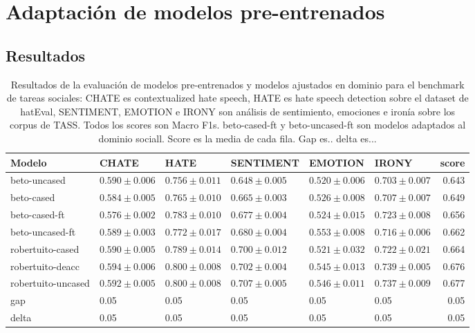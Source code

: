 \section{Adaptación de modelos pre-entrenados}


\subsection{Resultados}

\begin{table}[ht]
    \centering
    \footnotesize
    \begin{tabular}{llllllr}
        \toprule
        Modelo             & CHATE                   &  HATE              &  SENTIMENT        &  EMOTION          &  IRONY            &     score \\
        \midrule
        beto-uncased       & $0.590 \pm 0.006$ & $0.756 \pm 0.011$ &  $0.648 \pm 0.005$ &  $0.520 \pm 0.006$ & $0.703 \pm 0.007$ &  0.643 \\
        beto-cased         & $0.584 \pm 0.005$ & $0.765 \pm 0.010$ &  $0.665 \pm 0.003$ &  $0.526 \pm 0.008$ & $0.707 \pm 0.007$ &  0.649 \\
        beto-cased-ft      & $0.576 \pm 0.002$ & $0.783 \pm 0.010$ &  $0.677 \pm 0.004$ &  $0.524 \pm 0.015$ & $0.723 \pm 0.008$ &  0.656 \\
        beto-uncased-ft    & $0.589 \pm 0.003$ & $0.772 \pm 0.017$ &  $0.680 \pm 0.004$ &  $0.553 \pm 0.008$ & $0.716 \pm 0.006$ &  0.662 \\
        robertuito-cased   & $0.590 \pm 0.005$ & $0.789 \pm 0.014$ &  $0.700 \pm 0.012$ &  $0.521 \pm 0.032$ & $0.722 \pm 0.021$ &  0.664 \\
        robertuito-deacc   & $0.594 \pm 0.006$ & $0.800 \pm 0.008$ &  $0.702 \pm 0.004$ &  $0.545 \pm 0.013$ & $0.739 \pm 0.005$ &  0.676 \\
        robertuito-uncased & $0.592 \pm 0.005$ & $0.800 \pm 0.008$ &  $0.707 \pm 0.005$ &  $0.546 \pm 0.011$ & $0.737 \pm 0.009$ &  0.677 \\
        gap                & 0.05              & 0.05              & 0.05               & 0.05               & 0.05              & 0.05 \\
        delta              & 0.05              & 0.05              &  0.05              &  0.05              &  0.05             &  0.05 \\
        \bottomrule
    \end{tabular}
    \caption{Resultados de la evaluación de modelos pre-entrenados y modelos ajustados en dominio para el benchmark de tareas sociales: CHATE es contextualized hate speech, HATE es hate speech detection sobre el dataset de hatEval, SENTIMENT, EMOTION e IRONY son análisis de sentimiento, emociones e ironía sobre los corpus de TASS. Todos los scores son Macro F1s. beto-cased-ft y beto-uncased-ft son modelos adaptados al dominio sociall. Score es la media de cada fila. Gap es.. delta es...}

    \label{tab:domain_adaptation_evaluation_results}

\end{table}


